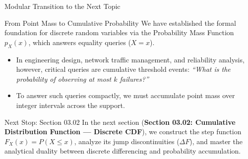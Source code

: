 \documentclass[10pt, aspectratio=169]{beamer}
\begin{document}
\begin{frame}{Modular Transition to the Next Topic}
  \fontsize{7.5pt}{9pt}\selectfont
  \begin{block}{From Point Mass to Cumulative Probability}
    \fontsize{7.5pt}{9pt}\selectfont
    We have established the formal foundation for discrete random variables via the Probability Mass Function $p_X(x)$, which answers equality queries ($X=x$).
    \begin{itemize}\itemsep=0.12cm
      \item In engineering design, network traffic management, and reliability analysis, however, critical queries are cumulative threshold events: \emph{``What is the probability of observing at most $k$ failures?''}
      \item To answer such queries compactly, we must accumulate point mass over integer intervals across the support.
    \end{itemize}
  \end{block}
  \vspace{-0.15cm}
  \pause
  \begin{alertblock}{Next Stop: Section 03.02}
    \fontsize{7.5pt}{9pt}\selectfont
    In the next section (\textbf{Section 03.02: Cumulative Distribution Function — Discrete CDF}), we construct the step function $F_X(x) = P(X \le x)$, analyze its jump discontinuities ($\Delta F$), and master the analytical duality between discrete differencing and probability accumulation.
  \end{alertblock}
\end{frame}
\end{document}
